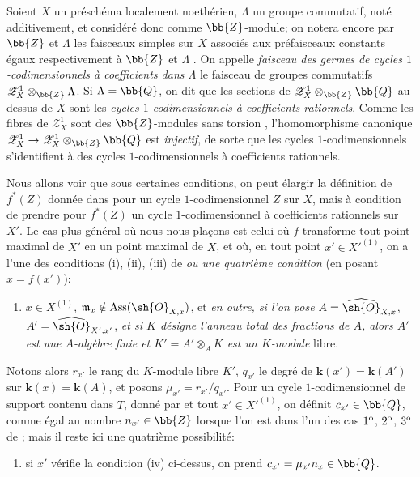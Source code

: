 \begin{env}[21.10.9]
Soient $X$ un préschéma localement noethérien, $\Lambda$ un groupe commutatif, noté additivement, et considéré donc comme $\bb{Z}$-module;
on notera encore par $\bb{Z}$ et $\Lambda$ les faisceaux simples sur $X$ associés aux préfaisceaux constants égaux respectivement à $\bb{Z}$ et $\Lambda$ .
On appelle \emph{faisceau des germes de cycles $1$-codimensionnels à coefficients dans $\Lambda$} le faisceau de groupes commutatifs $\mathscr{Z}^1_X\otimes_{\bb{Z}}\Lambda$.
Si $\Lambda=\bb{Q}$, on dit que les sections
de $\mathscr{Z}^1_X\otimes_{\bb{Z}}\bb{Q}$ au-dessus de $X$ sont les \emph{cycles $1$-codimensionnels à coefficients rationnels}.
Comme les fibres de $\mathscr{Z}^1_X$ sont des $\bb{Z}$-modules sans torsion , l'homomorphisme canonique $\mathscr{Z}^1_X\to\mathscr{Z}^1_X\otimes_{\bb{Z}}\bb{Q}$ est \emph{injectif}, de sorte que les cycles $1$-codimensionnels s'identifient à des cycles $1$-codimensionnels à coefficients rationnels.
\end{env}

\begin{env}[21.10.10]
\label{IV.21.10.10}
Nous allons voir que sous certaines conditions, on peut élargir la définition de $f^*(Z)$ donnée dans  pour un cycle $1$-codimensionnel $Z$ sur $X$, mais à condition de prendre pour $f^*(Z)$ un cycle $1$-codimensionnel à coefficients rationnels sur $X'$.
Le cas plus général où nous nous plaçons est celui où $f$ transforme tout point maximal de $X'$ en un point maximal de $X$, et où, en tout point $x'\in X'^{(1)}$, on a l'une des conditions (i), (ii), (iii) de  \emph{ou une quatrième condition} (en posant $x=f(x')$):
\begin{enumerate}
  \item[(iv)] $x\in X^{(1)}$, $\mathfrak{m}_x\notin\operatorname{Ass}(\sh{O}_{X,x})$, et \emph{en outre, si l'on pose} $A=\widehat{\sh{O}}_{X,x}$, $A'=\widehat{\sh{O}}_{X',x'}$, \emph{et si $K$ désigne l'anneau total des fractions de $A$, alors $A'$ est une $A$-algèbre finie et $K'=A'\otimes_AK$ est un $K$-module} libre.
\end{enumerate}

Notons alors $r_{x'}$ le rang du $K$-module libre $K'$, $q_{x'}$ le degré de $\boldsymbol{k}(x')=\boldsymbol{k}(A')$ sur $\boldsymbol{k}(x)=\boldsymbol{k}(A)$, et posons $\mu_{x'}=r_{x'}/q_{x'}$.
Pour un cycle $1$-codimensionnel de support contenu dans $T$, donné par  et tout $x'\in X'^{(1)}$, on définit $c_{x'}\in\bb{Q}$, comme égal au nombre $n_{x'}\in\bb{Z}$ lorsque l'on est dans l'un des cas $1\textsuperscript{o}$, $2\textsuperscript{o}$, $3\textsuperscript{o}$ de ; mais il reste ici une quatrième possibilité:
\begin{enumerate}
  \item[$4\textsuperscript{o}$] si $x'$ vérifie la condition (iv) ci-dessus, on prend $c_{x'}=\mu_{x'}n_x\in\bb{Q}$.
\end{enumerate}
\end{env}


